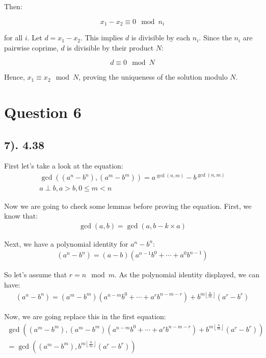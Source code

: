 \documentclass[12pt]{article}
\begin{document}
Then:

\[
x_1 - x_2 \equiv 0 \mod n_i
\]

for all \( i \). Let \( d = x_1 - x_2 \). This implies \( d \) is divisible by each \( n_i \). Since the \( n_i \) are pairwise coprime, \( d \) is divisible by their product \( N \):

\[
d \equiv 0 \mod N
\]

Hence, \( x_1 \equiv x_2 \mod N \), proving the uniqueness of the solution modulo \( N \).

\section*{Question 6}
\subsection*{7). 4.38}
First let's take a look at the equation:
\begin{gather*}
    \gcd((a^n - b^n), (a^m - b^m)) = a^{\gcd(n,m)} - b^{\gcd(n,m)} \\
    a \perp b, a > b, 0 \leq m < n
\end{gather*}

Now we are going to check some lemmas before proving the equation. First, we know that:
\begin{gather*}
    \gcd(a, b) = \gcd(a, b - k \times a)
\end{gather*}

Next, we have a polynomial identity for $a^n - b^n$:
\begin{gather*}
    (a^n - b^n) = (a - b)(a^{n-1}b^0 + \cdots + a^0b^{n-1})
\end{gather*}

So let's assume that $r = n \mod m$. As the polynomial identity displayed, we can have:
\begin{gather*}
    (a^n - b^n) = (a^m - b^m)(a^{n-m}b^0 + \cdots + a^r b^{n-m-r}) + b^{m \left\lfloor \frac{n}{m} \right\rfloor} (a^r - b^r)
\end{gather*}

Now, we are going replace this in the first equation:
\begin{gather*}
    \gcd((a^m - b^m), (a^m - b^m)(a^{n-m}b^0 + \cdots + a^r b^{n-m-r}) + b^{m \left\lfloor \frac{n}{m} \right\rfloor} (a^r - b^r)) \\
    = \gcd((a^m - b^m), b^{m \left\lfloor \frac{n}{m} \right\rfloor} (a^r - b^r))
\end{gather*}
\end{document}
